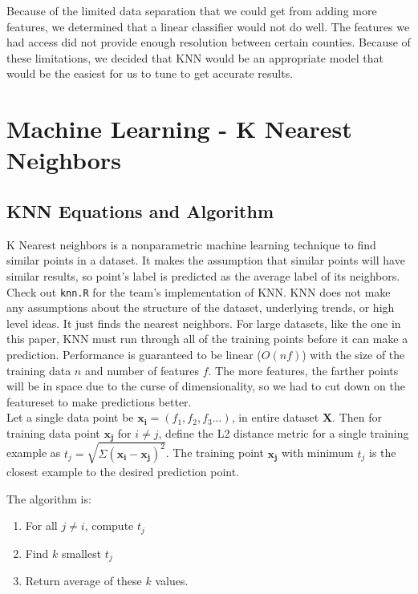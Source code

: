 \documentclass[11pt]{article}
\begin{document}
Because of the limited data separation that we could get from adding more features, we determined that a linear classifier would not do well. The features we had access did not provide enough resolution between certain counties. Because of these limitations, we decided that KNN would be an appropriate model that would be the easiest for us to tune to get accurate results.
\newpage

\section{Machine Learning - K Nearest Neighbors}
\subsection{KNN Equations and Algorithm}
K Nearest neighbors is a nonparametric machine learning technique to find similar points in a dataset. It makes the assumption that similar points will have similar results, so point's label is predicted as the average label of its neighbors. Check out \texttt{knn.R} for the team's implementation of KNN. 
KNN does not make any assumptions about the structure of the dataset, underlying trends, or high level ideas. It just finds the nearest neighbors. For large datasets, like the one in this paper, KNN must run through all of the training points before it can make a prediction. Performance is guaranteed to be linear ($O(nf)$) with the size of the training data $n$ and number of features $f$. The more features, the farther points will be in space due to the curse of dimensionality, so we had to cut down on the featureset to make predictions better. \\ 

Let a single data point be $\mathbf{x_i} = (f_1, f_2, f_3...)$, in entire dataset $\mathbf{X}$. Then for training data point $\mathbf{x_j}$ for $i \neq j$, define the L2 distance metric for a single training example as $t_j = \sqrt{\Sigma(\mathbf{x_i} - \mathbf{x_j})^2}$. The training point $\mathbf{x_j}$ with minimum $t_j$ is the closest example to the desired prediction point. 

The algorithm is: 

\begin{enumerate}
\item For all $j \neq i$, compute $t_j$ 
\item Find $k$ smallest $t_j$ 
\item Return average of these $k$ values. 
\end{enumerate}
\end{document}
